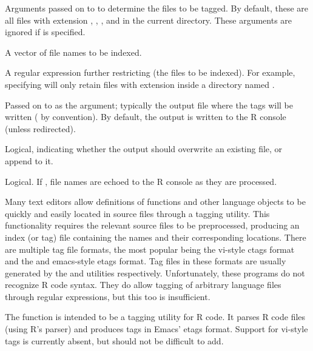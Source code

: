 \begin{Arguments}
\begin{ldescription}
\item[\code{path, pattern, recursive}] 
Arguments passed on to  to determine the
files to be tagged.  By default, these are all files with extension
, , , and  in the current
directory.  These arguments are ignored if  is specified.

\item[\code{src}] 
A vector of file names to be indexed.

\item[\code{keep.re}]  A regular expression further restricting 
(the files to be indexed).  For example, specifying
 will only retain files with
extension  inside a directory named .

\item[\code{ofile}]  Passed on to  as the 
argument; typically the output file where the tags will be written
( by convention).  By default, the output is written to
the R console (unless redirected).

\item[\code{append}]  Logical, indicating whether the output should overwrite
an existing file, or append to it.

\item[\code{verbose}]  Logical.  If , file names are echoed to the
R console as they are processed.

\end{ldescription}
\end{Arguments}
%
\begin{Details}\relax

Many text editors allow definitions of functions and other language
objects to be quickly and easily located in source files through a
tagging utility.  This functionality requires the relevant source
files to be preprocessed, producing an index (or tag) file containing
the names and their corresponding locations.  There are multiple tag
file formats, the most popular being the vi-style ctags format and the
and emacs-style etags format.  Tag files in these formats are usually
generated by the  and  utilities respectively.
Unfortunately, these programs do not recognize R code syntax.  They do
allow tagging of arbitrary language files through regular expressions,
but this too is insufficient.

The  function is intended to be a tagging utility for R
code.  It parses R code files (using R's parser) and produces tags in
Emacs' etags format.  Support for vi-style tags is currently absent,
but should not be difficult to add.
\end{Details}
